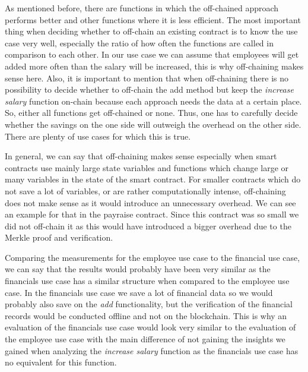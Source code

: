 As mentioned before, there are functions in which the off-chained approach performs better and other functions where it is less efficient.
The most important thing when deciding whether to off-chain an existing contract is to know the use case very well, especially the ratio of how often the functions are called in comparison to each other.
In our use case we can assume that employees will get added more often than the salary will be increased, this is why off-chaining makes sense here.
Also, it is important to mention that when off-chaining there is no possibility to decide whether to off-chain the add method but keep the \textit{increase salary} function on-chain because each approach needs the data at a certain place.
So, either all functions get off-chained or none.
Thus, one has to carefully decide whether the savings on the one side will outweigh the overhead on the other side.
There are plenty of use cases for which this is true.

In general, we can say that off-chaining makes sense especially when smart contracts use mainly large state variables and functions which change large or many variables in the state of the smart contract.
For smaller contracts which do not save a lot of variables, or are rather computationally intense, off-chaining does not make sense as it would introduce an unnecessary overhead.
We can see an example for that in the payraise contract.
Since this contract was so small we did not off-chain it as this would have introduced a bigger overhead due to the Merkle proof and verification.

Comparing the measurements for the employee use case to the financial use case, we can say that the results would probably have been very similar as the financials use case has a similar structure when compared to the employee use case.
In the financials use case we save a lot of financial data so we would probably also save on the \textit{add} functionality, but the verification of the financial records would be conducted offline and not on the blockchain.
This is why an evaluation of the financials use case would look very similar to the evaluation of the employee use case with the main difference of not gaining the insights we gained when analyzing the \textit{increase salary} function as the financials use case has no equivalent for this function.

